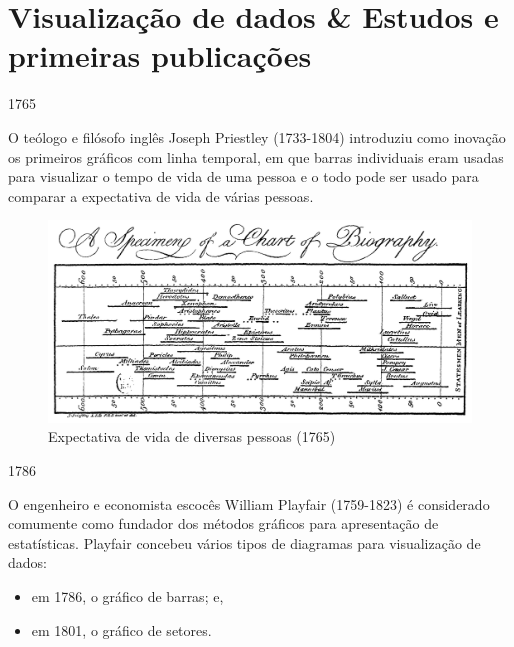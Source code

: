 \documentclass[
]{book}
\providecommand{\tightlist}{%
  \setlength{\itemsep}{0pt}\setlength{\parskip}{0pt}}
\begin{document}
\hypertarget{visualizauxe7uxe3o-de-dados-estudos-e-primeiras-publicauxe7uxf5es}{%
\section{Visualização de dados \& Estudos e primeiras publicações}\label{visualizauxe7uxe3o-de-dados-estudos-e-primeiras-publicauxe7uxf5es}}

1765

\hfill\break

O teólogo e filósofo inglês Joseph Priestley (1733-1804) introduziu como inovação os primeiros gráficos com linha temporal, em que barras individuais eram usadas para visualizar o tempo de vida de uma pessoa e o todo pode ser usado para comparar a expectativa de vida de várias pessoas.

\hfill\break

\begin{figure}

{\centering \includegraphics[width=0.75\linewidth]{images1/priestley-timechart-1765} 

}

\caption{Expectativa de vida de diversas pessoas (1765)}\label{fig:unnamed-chunk-11}
\end{figure}

\hfill\break

1786

\hfill\break

O engenheiro e economista escocês William Playfair (1759-1823) é considerado comumente como fundador dos métodos gráficos para apresentação de estatísticas. Playfair concebeu vários tipos de diagramas para visualização de dados:

\begin{itemize}
\tightlist
\item
  em 1786, o gráfico de barras; e,
\item
  em 1801, o gráfico de setores.
\end{itemize}

\hfill\break
\end{document}
